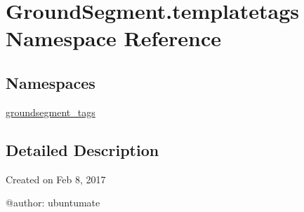 \hypertarget{namespace_ground_segment_1_1templatetags}{}\section{Ground\+Segment.\+templatetags Namespace Reference}
\label{namespace_ground_segment_1_1templatetags}
\subsection*{Namespaces}
\begin{DoxyCompactItemize}
\item 
 \hyperlink{namespace_ground_segment_1_1templatetags_1_1groundsegment__tags}{groundsegment\+\_\+tags}
\end{DoxyCompactItemize}


\subsection{Detailed Description}
\begin{DoxyVerb}Created on Feb 8, 2017

@author: ubuntumate
\end{DoxyVerb}
 